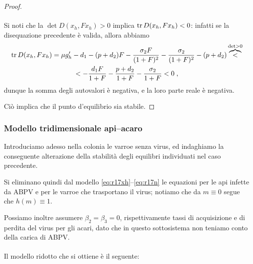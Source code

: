 \begin{proof}
\paragraph{}
Si noti che la $\det D(x_h, F x_h) > 0$ implica $\operatorname{tr} D(x_h, F x_h) <0$: infatti se la disequazione
precedente è valida, allora abbiamo
\begin{multline*}
\operatorname{tr} D(x_h, F x_h) = \mu g_h' -d_1 -(p+d_2)F - \frac{\sigma_2 F}{(1+F)^2} - \frac{\sigma_2}{(1+F)^2} - (p + d_2) \overbrace{<}^{\det >0} \\
< - \frac{d_1 F}{1+F} - \frac{p +d_2}{1+F} - \frac{\sigma_2}{1+F} < 0 \; ,
\end{multline*}
dunque la somma degli autovalori è negativa, e la loro parte reale è negativa.

Ciò implica che il punto d'equilibrio sia stabile.
\end{proof}


\subsubsection{Modello tridimensionale api--acaro}
Introduciamo adesso nella colonia le varroe senza virus, ed indaghiamo la conseguente alterazione della stabilità degli equilibri individuati nel caso precedente.

Si eliminano quindi dal modello \eqref{eq:r17xh}--\eqref{eq:r17n} le equazioni per le api infette da ABPV e per le varroe che trasportano il virus; notiamo che da $m \equiv 0$ segue che $h(m) \equiv 1$.

Possiamo inoltre assumere $\beta_2 = \beta_3 = 0$, rispettivamente tassi di acquisizione e di perdita
del virus per gli acari, dato che in questo sottosistema non teniamo conto della carica di ABPV.

\paragraph{}
Il modello ridotto che si ottiene è il seguente:

